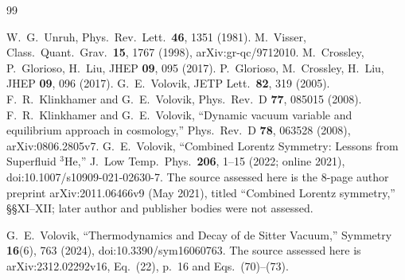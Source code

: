 \documentclass[aps,prd,twocolumn,showpacs,superscriptaddress,nofootinbib]{revtex4-2}
\begin{document}
\begin{thebibliography}{99}

 W.~G.~Unruh, Phys.\ Rev.\ Lett.\ \textbf{46}, 1351 (1981).
 M.~Visser, Class.\ Quant.\ Grav.\ \textbf{15}, 1767 (1998), arXiv:gr-qc/9712010.
 M.~Crossley, P.~Glorioso, H.~Liu, JHEP \textbf{09}, 095 (2017).
 P.~Glorioso, M.~Crossley, H.~Liu, JHEP \textbf{09}, 096 (2017).
 G.~E.~Volovik, JETP Lett.\ \textbf{82}, 319 (2005).
 F.~R.~Klinkhamer and G.~E.~Volovik, Phys.\ Rev.\ D \textbf{77}, 085015 (2008).
 F.~R.~Klinkhamer and G.~E.~Volovik, ``Dynamic vacuum variable and equilibrium approach in cosmology,'' Phys.\ Rev.\ D \textbf{78}, 063528 (2008), arXiv:0806.2805v7.
G.~E.~Volovik, ``Combined Lorentz Symmetry: Lessons from Superfluid
${}^3$He,'' J.\ Low Temp.\ Phys.\ \textbf{206}, 1--15 (2022;
online 2021), doi:10.1007/s10909-021-02630-7.
The source assessed here is the 8-page author preprint
arXiv:2011.06466v9 (May 2021), titled ``Combined Lorentz symmetry,''
§§XI--XII; later author and publisher bodies were not assessed.

G.~E.~Volovik, ``Thermodynamics and Decay of de Sitter Vacuum,''
Symmetry \textbf{16}(6), 763 (2024), doi:10.3390/sym16060763.
The source assessed here is arXiv:2312.02292v16,
Eq.~(22), p.~16 and Eqs.~(70)--(73).


\end{thebibliography}
\end{document}
